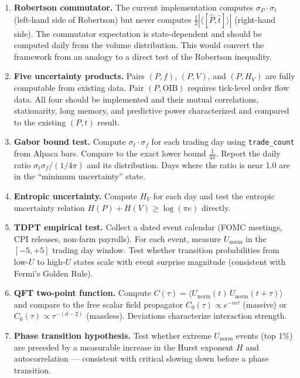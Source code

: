 \documentclass[11pt]{article}
\begin{document}
\begin{enumerate}
    \item \textbf{Robertson commutator.} The current implementation computes $\sigma_P \cdot \sigma_t$ (left-hand side of Robertson) but never computes $\frac{1}{2}|\langle[\hat{P},\hat{t}]\rangle|$ (right-hand side). The commutator expectation is state-dependent and should be computed daily from the volume distribution. This would convert the framework from an analogy to a direct test of the Robertson inequality.

    \item \textbf{Five uncertainty products.} Pairs $(P,f)$, $(P,V)$, and $(P,H_V)$ are fully computable from existing data. Pair $(P,\mathrm{OIB})$ requires tick-level order flow data. All four should be implemented and their mutual correlations, stationarity, long memory, and predictive power characterized and compared to the existing $(P,t)$ result.

    \item \textbf{Gabor bound test.} Compute $\sigma_t \cdot \sigma_f$ for each trading day using \texttt{trade\_count} from Alpaca bars. Compare to the exact lower bound $\frac{1}{4\pi}$. Report the daily ratio $\sigma_t \sigma_f / (1/4\pi)$ and its distribution. Days where the ratio is near 1.0 are in the ``minimum uncertainty'' state.

    \item \textbf{Entropic uncertainty.} Compute $H_V$ for each day and test the entropic uncertainty relation $H(P) + H(V) \geq \log(\pi e)$ directly.

    \item \textbf{TDPT empirical test.} Collect a dated event calendar (FOMC meetings, CPI releases, non-farm payrolls). For each event, measure $U_\mathrm{norm}$ in the $[-5, +5]$ trading day window. Test whether transition probabilities from low-$U$ to high-$U$ states scale with event surprise magnitude (consistent with Fermi's Golden Rule).

    \item \textbf{QFT two-point function.} Compute $C(\tau) = \langle U_\mathrm{norm}(t)\, U_\mathrm{norm}(t+\tau)\rangle$ and compare to the free scalar field propagator $C_0(\tau) \propto e^{-m\tau}$ (massive) or $C_0(\tau) \propto \tau^{-(d-2)}$ (massless). Deviations characterize interaction strength.

    \item \textbf{Phase transition hypothesis.} Test whether extreme $U_\mathrm{norm}$ events (top 1\%) are preceded by a measurable increase in the Hurst exponent $H$ and autocorrelation --- consistent with critical slowing down before a phase transition.


\end{enumerate}
\end{document}
